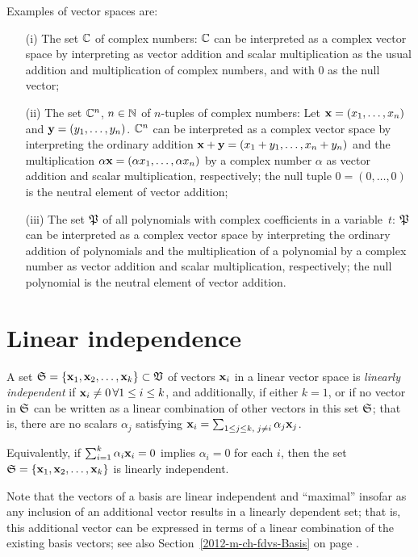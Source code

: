 {
\color{blue}
\bexample
Examples of vector spaces are:
\begin{itemize}
\item[(i)]
The set ${\Bbb C}$ of complex numbers: ${\Bbb C}$  can be interpreted as a complex vector space by  interpreting as vector addition and scalar multiplication
as the usual addition and multiplication of complex numbers, and with $0$ as the null vector;
\item[(ii)]
The set ${\Bbb C}^n$, $n \in {\Bbb N}$ of $n$-tuples of complex numbers:
Let
${\bf x}=
(x_1,\ldots , x_n)$
and
${\bf y}=
(y_1,\ldots , y_n)$.
 ${\Bbb C}^n$  can be interpreted as a complex vector space by  interpreting
the ordinary addition  $ {\bf x} + {\bf y} =  (x_1+y_1,\ldots , x_n+y_n)$
and the multiplication $\alpha {\bf x}=
(\alpha  x_1,\ldots ,\alpha  x_n)$ by a complex number $\alpha$ as vector addition
 and scalar multiplication, respectively;
the null tuple $0 =
(0,\ldots ,0)$ is the neutral element of vector addition;
\item[(iii)]
The set ${\frak P}$
 of all polynomials with complex coefficients in a variable~$t$:
${\frak P}$  can be interpreted as a complex vector space by  interpreting
the ordinary addition of polynomials and the multiplication of a polynomial by a complex number as vector addition and scalar multiplication,
respectively;
the null polynomial is the neutral element of vector addition.
\end{itemize}
\eexample
}


\section{Linear independence}

A set ${\frak S}=\{
{\bf x}_1,
{\bf x}_2,
\ldots ,
{\bf x}_k\} \subset {\frak V}$
of vectors ${\bf x}_i$ in a linear vector space
is {\em linearly independent}
if ${\bf x}_i\neq 0\,\forall 1\le i\le k$,
and additionally, if either $k=1$,
or if no vector in ${\frak S}$ can be written as a linear combination of other vectors in this set ${\frak S}$;
that is, there are no scalars $\alpha_j$ satisfying
 ${\bf x}_i=\sum_{1\le j \le k, \; j\neq i}\alpha_j {\bf x}_j$.

Equivalently, if $\sum_{i=1}^k \alpha_i {\bf x}_i = 0$
 implies $\alpha_i =0$ for each $i$, then the set
${\frak S}=\{
{\bf x}_1,
{\bf x}_2,
\ldots ,
{\bf x}_k\}  $ is linearly independent.


Note that the vectors of a basis are linear independent and ``maximal''
insofar as any inclusion of an additional vector results in a linearly dependent set;
that is, this additional vector can be expressed in terms of a linear combination of the
existing basis vectors; see also Section~\ref{2012-m-ch-fdvs-Basis} on page \pageref{2012-m-ch-fdvs-Basis}.

